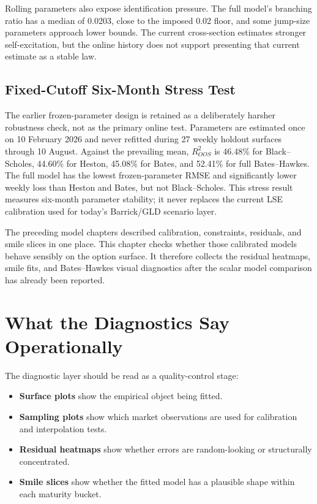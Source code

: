 \documentclass[a4paper,10pt,titlepage,oneside,openany]{book}
\theoremstyle{plain}
\theoremstyle{definition}
\theoremstyle{remark}
\begin{document}
Rolling parameters also expose identification pressure. The full model's branching ratio has a median of 0.0203, close to the imposed 0.02 floor, and some jump-size parameters approach lower bounds. The current cross-section estimates stronger self-excitation, but the online history does not support presenting that current estimate as a stable law.

\subsection{Fixed-Cutoff Six-Month Stress Test}

The earlier frozen-parameter design is retained as a deliberately harsher robustness check, not as the primary online test. Parameters are estimated once on 10 February 2026 and never refitted during 27 weekly holdout surfaces through 10 August. Against the prevailing mean, \(R^2_{OOS}\) is 46.48\% for Black--Scholes, 44.60\% for Heston, 45.08\% for Bates, and 52.41\% for full Bates--Hawkes. The full model has the lowest frozen-parameter RMSE and significantly lower weekly loss than Heston and Bates, but not Black--Scholes. This stress result measures six-month parameter stability; it never replaces the current LSE calibration used for today's Barrick/GLD scenario layer.



The preceding model chapters described calibration, constraints, residuals, and smile slices in one place. This chapter checks whether those calibrated models behave sensibly on the option surface. It therefore collects the residual heatmaps, smile fits, and Bates--Hawkes visual diagnostics after the scalar model comparison has already been reported.

\section{What the Diagnostics Say Operationally}

The diagnostic layer should be read as a quality-control stage:

\begin{itemize}[leftmargin=8mm, itemsep=2pt]
    \item \textbf{Surface plots} show the empirical object being fitted.
    \item \textbf{Sampling plots} show which market observations are used for calibration and interpolation tests.
    \item \textbf{Residual heatmaps} show whether errors are random-looking or structurally concentrated.
    \item \textbf{Smile slices} show whether the fitted model has a plausible shape within each maturity bucket.
\end{itemize}
\end{document}
